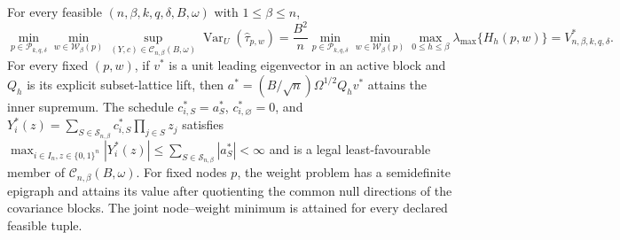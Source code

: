 For every feasible \((n,\beta,k,q,\delta,B,\omega)\) with \(1\le\beta\le n\),
\[
\min_{p\in\mathcal P_{k,q,\delta}}\min_{w\in\mathcal W_\beta(p)}\sup_{(Y,c)\in\mathcal C_{n,\beta}(B,\omega)}\operatorname{Var}_U(\widehat\tau_{p,w})=\frac{B^2}{n}\min_{p\in\mathcal P_{k,q,\delta}}\min_{w\in\mathcal W_\beta(p)}\max_{0\le h\le\beta}\lambda_{\max}\{H_h(p,w)\}=V^*_{n,\beta,k,q,\delta}.
\]
For every fixed \((p,w)\), if \(v^*\) is a unit leading eigenvector in an active block and \(Q_h\) is its explicit subset-lattice lift, then \(a^*=(B/\sqrt n)\Omega^{1/2}Q_hv^*\) attains the inner supremum. The schedule \(c^*_{i,S}=a^*_S\), \(c^*_{i,\varnothing}=0\), and \(Y_i^*(z)=\sum_{S\in\mathcal S_{n,\beta}}c^*_{i,S}\prod_{j\in S}z_j\) satisfies \(\max_{i\in I_n,z\in\{0,1\}^n}|Y_i^*(z)|\le\sum_{S\in\mathcal S_{n,\beta}}|a_S^*|<\infty\) and is a legal least-favourable member of \(\mathcal C_{n,\beta}(B,\omega)\). For fixed nodes \(p\), the weight problem has a semidefinite epigraph and attains its value after quotienting the common null directions of the covariance blocks.  The joint node--weight minimum is attained for every declared feasible tuple.